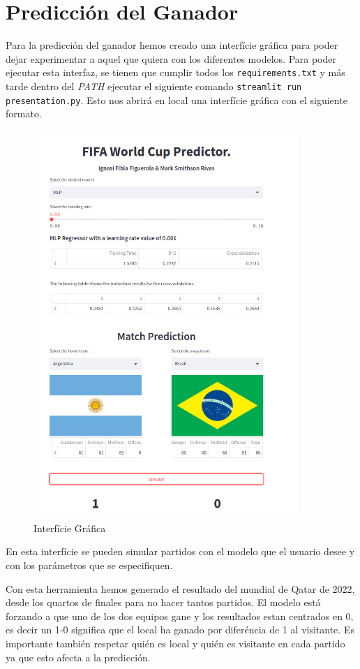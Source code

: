 \section{Predicción del Ganador}
Para la predicción del ganador hemos creado una interfície gráfica para poder dejar experimentar a aquel que quiera con los diferentes modelos. Para poder ejecutar esta interfaz, se tienen que cumplir todos los \texttt{requirements.txt} y más tarde dentro del \textit{PATH} ejecutar el siguiente comando \texttt{streamlit run presentation.py}. Esto nos abrirá en local una interfície gráfica con el siguiente formato.  

\begin{figure}[H]
    \centering
    \includegraphics[width=10cm]{images/webPage.png}
    \caption{Interfície Gráfica}
    \label{Interificie-grafica}
\end{figure}

En esta interfície se pueden simular partidos con el modelo que el usuario desee y con los parámetros que se especifiquen.
\newline

Con esta herramienta hemos generado el resultado del mundial de Qatar de 2022, desde los quartos de finales para no hacer tantos partidos. El modelo está forzando a que uno de los dos equipos gane y los resultados estan centrados en 0, es decir un 1-0 significa que el local ha ganado por diferéncia de 1 al visitante. Es importante también respetar quién es local y quién es visitante en cada partido ya que esto afecta a la predicción.
\newline

